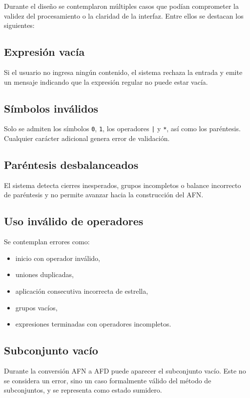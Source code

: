 \documentclass[12pt]{article}
\begin{document}
Durante el diseño se contemplaron múltiples casos que podían comprometer la validez del procesamiento o la claridad de la interfaz. Entre ellos se destacan los siguientes:

\subsection{Expresión vacía}

Si el usuario no ingresa ningún contenido, el sistema rechaza la entrada y emite un mensaje indicando que la expresión regular no puede estar vacía.

\subsection{Símbolos inválidos}

Solo se admiten los símbolos \texttt{0}, \texttt{1}, los operadores \texttt{|} y \texttt{*}, así como los paréntesis. Cualquier carácter adicional genera error de validación.

\subsection{Paréntesis desbalanceados}

El sistema detecta cierres inesperados, grupos incompletos o balance incorrecto de paréntesis y no permite avanzar hacia la construcción del AFN.

\subsection{Uso inválido de operadores}

Se contemplan errores como:
\begin{itemize}
    \item inicio con operador inválido,
    \item uniones duplicadas,
    \item aplicación consecutiva incorrecta de estrella,
    \item grupos vacíos,
    \item expresiones terminadas con operadores incompletos.
\end{itemize}

\subsection{Subconjunto vacío}

Durante la conversión AFN a AFD puede aparecer el subconjunto vacío. Este no se considera un error, sino un caso formalmente válido del método de subconjuntos, y se representa como estado sumidero.
\end{document}
